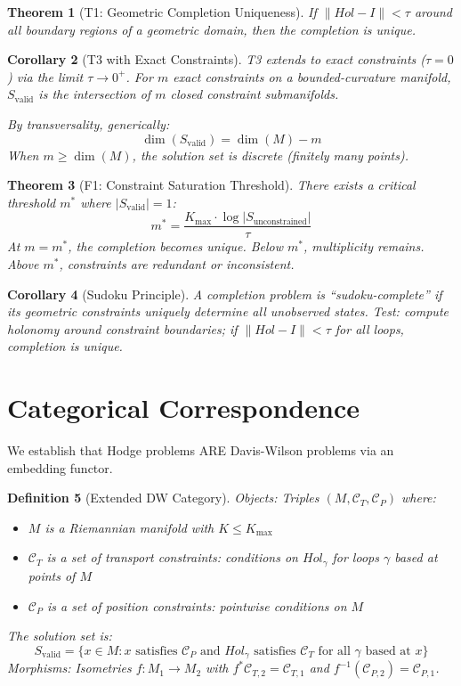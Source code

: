 \documentclass[12pt]{article}
\newtheorem{theorem}{Theorem}
\newtheorem{corollary}[theorem]{Corollary}
\newtheorem{definition}[theorem]{Definition}
\begin{document}
\begin{theorem}[T1: Geometric Completion Uniqueness]
If $\|Hol - I\| < \tau$ around all boundary regions of a geometric domain,
then the completion is unique.
\end{theorem}

\begin{corollary}[T3 with Exact Constraints]
T3 extends to exact constraints ($\tau = 0$) via the limit $\tau \to 0^+$.
For $m$ exact constraints on a bounded-curvature manifold, $S_{\text{valid}}$ 
is the intersection of $m$ closed constraint submanifolds.

By transversality, generically:
\[
\dim(S_{\text{valid}}) = \dim(M) - m
\]
When $m \geq \dim(M)$, the solution set is discrete (finitely many points).
\end{corollary}

\begin{theorem}[F1: Constraint Saturation Threshold]
There exists a critical threshold $m^*$ where $|S_{\text{valid}}| = 1$:
\[
m^* = \frac{K_{\max} \cdot \log|S_{\text{unconstrained}}|}{\tau}
\]
At $m = m^*$, the completion becomes unique. Below $m^*$, multiplicity remains.
Above $m^*$, constraints are redundant or inconsistent.
\end{theorem}

\begin{corollary}[Sudoku Principle]
A completion problem is ``sudoku-complete'' if its geometric constraints 
uniquely determine all unobserved states. Test: compute holonomy around 
constraint boundaries; if $\|Hol - I\| < \tau$ for all loops, completion is unique.
\end{corollary}

\section{Categorical Correspondence}

We establish that Hodge problems ARE Davis-Wilson problems via an embedding functor.

\begin{definition}[Extended DW Category]
Objects: Triples $(M, \mathcal{C}_T, \mathcal{C}_P)$ where:
\begin{itemize}
\item $M$ is a Riemannian manifold with $K \leq K_{\max}$
\item $\mathcal{C}_T$ is a set of \emph{transport constraints}: conditions on 
      $Hol_\gamma$ for loops $\gamma$ based at points of $M$
\item $\mathcal{C}_P$ is a set of \emph{position constraints}: pointwise conditions on $M$
\end{itemize}
The solution set is:
\[
S_{\text{valid}} = \{x \in M : x \text{ satisfies } \mathcal{C}_P \text{ and }
Hol_\gamma \text{ satisfies } \mathcal{C}_T \text{ for all } \gamma \text{ based at } x\}
\]
Morphisms: Isometries $f: M_1 \to M_2$ with $f^*\mathcal{C}_{T,2} = \mathcal{C}_{T,1}$ 
and $f^{-1}(\mathcal{C}_{P,2}) = \mathcal{C}_{P,1}$.
\end{definition}
\end{document}
